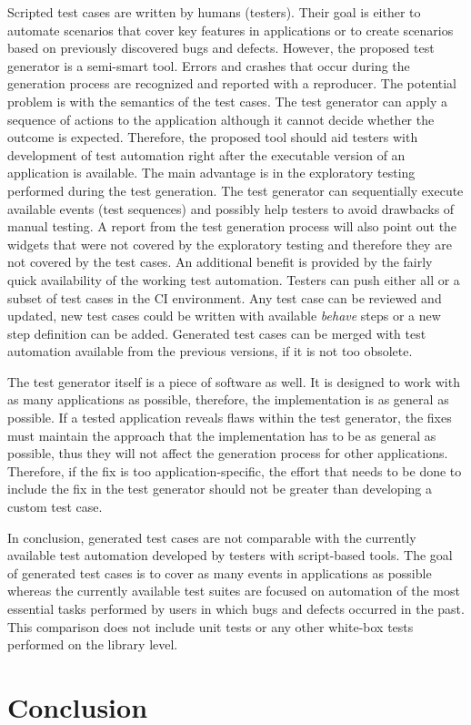 Scripted test cases are written by humans (testers). Their goal is either to automate scenarios that cover key features in applications or to create scenarios based on previously discovered bugs and defects. However, the proposed test generator is a semi-smart tool. Errors and crashes that occur during the generation process are recognized and reported with a reproducer. The potential problem is with the semantics of the test cases. The test generator can apply a sequence of actions to the application although it cannot decide whether the outcome is expected. Therefore, the proposed tool should aid testers with development of test automation right after the executable version of an application is available. The main advantage is in the exploratory testing performed during the test generation. The test generator can sequentially execute available events (test sequences) and possibly help testers to avoid drawbacks of manual testing. A report from the test generation process will also point out the widgets that were not covered by the exploratory testing and therefore they are not covered by the test cases. An additional benefit is provided by the fairly quick availability of the working test automation. Testers can push either all or a subset of test cases in the CI environment. Any test case can be reviewed and updated, new test cases could be written with available \textit{behave} steps or a new step definition can be added. Generated test cases can be merged with test automation available from the previous versions, if it is not too obsolete.

The test generator itself is a piece of software as well. It is designed to work with as many applications as possible, therefore, the implementation is as general as possible. If a tested application reveals flaws within the test generator, the fixes must maintain the approach that the implementation has to be as general as possible, thus they will not affect the generation process for other applications. Therefore, if the fix is too application-specific, the effort that needs to be done to include the fix in the test generator should not be greater than developing a custom test case.

In conclusion, generated test cases are not comparable with the currently available test automation developed by testers with script-based tools. The goal of generated test cases is to cover as many events in applications as possible whereas the currently available test suites are focused on automation of the most essential tasks performed by users in which bugs and defects occurred in the past. This comparison does not include unit tests or any other white-box tests performed on the library level.


\chapter{Conclusion}
